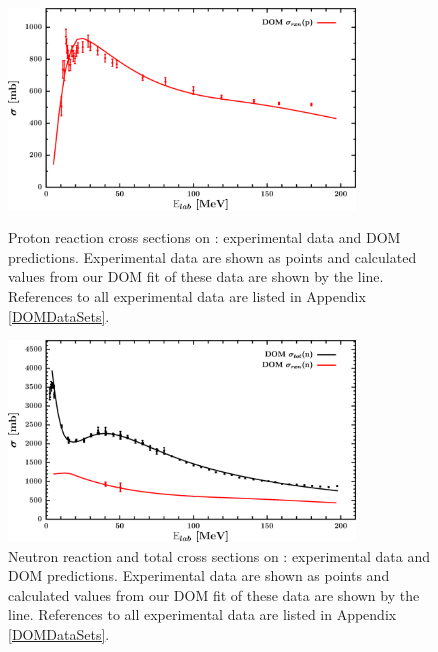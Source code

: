 \begin{figure}[tb]
    \centering
    \includegraphics[width=0.82\textwidth]{figures/ca40_protonInelastic.png}
    \caption[Proton \rxn\ of \caForty: DOM predictions and experimental data]
    {
        Proton reaction cross sections on \caForty: experimental data and
        DOM predictions. Experimental data are shown as points and 
        calculated values from our DOM fit of these data are shown
        by the line. References to all experimental
        data are listed in Appendix \ref{DOMDataSets}.
    }
    \label{Ca40ProtonInelastic}
    \vspace{16pt}
    \includegraphics[width=0.82\textwidth]{figures/ca40_neutronInelastic.png}
    \caption[Neutron \rxn\ and \tot\ of \caForty: DOM predictions and experimental data]
    {
        Neutron reaction and total cross sections on \caForty: experimental data and
        DOM predictions. Experimental data are shown as points and 
        calculated values from our DOM fit of these data are shown
        by the line. References to all experimental
        data are listed in Appendix \ref{DOMDataSets}.
    }
    \label{Ca40NeutronInelastic}
\end{figure}

